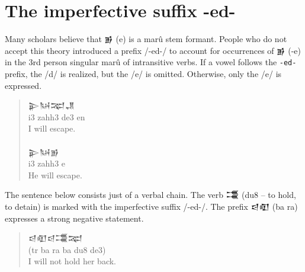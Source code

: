 \documentclass[a4paper,12pt]{book}
\newcommand{\fcn}{\setmainfont{Akkadian.otf}}
\newcommand{\fcm}{\large\setmainfont{Akkadian.otf}}
\begin{document}
\section{The imperfective suffix -ed-}
Many scholars believe that {\fcn 𒂊} (e)
is a marû stem formant. People who do not accept
this theory introduced a prefix /-ed-/ to
account for occurrences of {\fcn 𒂊}  (-e)
in the 3rd person
singular marû of intransitive verbs.
If a vowel follows the \verb|-ed-| prefix,
the /d/ is realized, but
the  /e/ is omitted.
Otherwise, only the /e/ is expressed.\\
\begin{quotation}
\noindent
{\fcm 𒉌𒀄𒉈𒂗}\\
i3 zahh3 de3 en\\
I will escape.\\

\verb||\\
{\fcm 𒉌𒀄𒂊}\\
i3 zahh3 e\\
He will escape.
\end{quotation}

The sentence below consists just of a verbal chain.
The verb {\fcn 𒂃}  (du8 -- to hold, to detain)
is marked with the imperfective suffix /-ed-/.
The prefix {\fcn 𒁀𒊏}  (ba ra) expresses
a strong negative statement.
\begin{quote}
  {\fcm 𒁀𒊏𒁀𒂃𒉈}\\
  (tr ba ra ba du8 de3)\\
  I will not hold her back.
\end{quote}



\printindex
\end{document}
